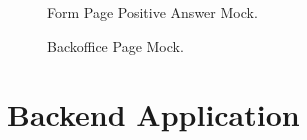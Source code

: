 \begin{figure}[H]
	\begin{center}
	\end{center}
	\caption{Form Page Positive Answer Mock.}\label{fig:form_yes}
\end{figure}

\begin{figure}[H]
	\begin{center}
	\end{center}
	\caption{Backoffice Page Mock.}\label{fig:backoffice}
\end{figure}

\newpage





\section{Backend Application}

